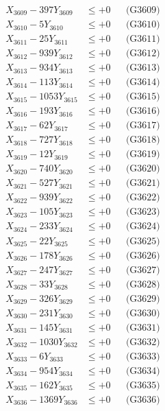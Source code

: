 \documentclass[a4paper,10pt]{article}
\begin{document}
{\begin{align}
X_{3609} - 397Y_{3609} &\leq +0 && \text{(G3609)} \\
X_{3610} - 5Y_{3610} &\leq +0 && \text{(G3610)} \\
\allowbreak
X_{3611} - 25Y_{3611} &\leq +0 && \text{(G3611)} \\
X_{3612} - 939Y_{3612} &\leq +0 && \text{(G3612)} \\
X_{3613} - 934Y_{3613} &\leq +0 && \text{(G3613)} \\
X_{3614} - 113Y_{3614} &\leq +0 && \text{(G3614)} \\
X_{3615} - 1053Y_{3615} &\leq +0 && \text{(G3615)} \\
X_{3616} - 193Y_{3616} &\leq +0 && \text{(G3616)} \\
X_{3617} - 62Y_{3617} &\leq +0 && \text{(G3617)} \\
X_{3618} - 727Y_{3618} &\leq +0 && \text{(G3618)} \\
X_{3619} - 12Y_{3619} &\leq +0 && \text{(G3619)} \\
X_{3620} - 740Y_{3620} &\leq +0 && \text{(G3620)} \\
\allowbreak
X_{3621} - 527Y_{3621} &\leq +0 && \text{(G3621)} \\
X_{3622} - 939Y_{3622} &\leq +0 && \text{(G3622)} \\
X_{3623} - 105Y_{3623} &\leq +0 && \text{(G3623)} \\
X_{3624} - 233Y_{3624} &\leq +0 && \text{(G3624)} \\
X_{3625} - 22Y_{3625} &\leq +0 && \text{(G3625)} \\
X_{3626} - 178Y_{3626} &\leq +0 && \text{(G3626)} \\
X_{3627} - 247Y_{3627} &\leq +0 && \text{(G3627)} \\
X_{3628} - 33Y_{3628} &\leq +0 && \text{(G3628)} \\
X_{3629} - 326Y_{3629} &\leq +0 && \text{(G3629)} \\
X_{3630} - 231Y_{3630} &\leq +0 && \text{(G3630)} \\
\allowbreak
X_{3631} - 145Y_{3631} &\leq +0 && \text{(G3631)} \\
X_{3632} - 1030Y_{3632} &\leq +0 && \text{(G3632)} \\
X_{3633} - 6Y_{3633} &\leq +0 && \text{(G3633)} \\
X_{3634} - 954Y_{3634} &\leq +0 && \text{(G3634)} \\
X_{3635} - 162Y_{3635} &\leq +0 && \text{(G3635)} \\
X_{3636} - 1369Y_{3636} &\leq +0 && \text{(G3636)} \\

\end{align}}
\end{document}
